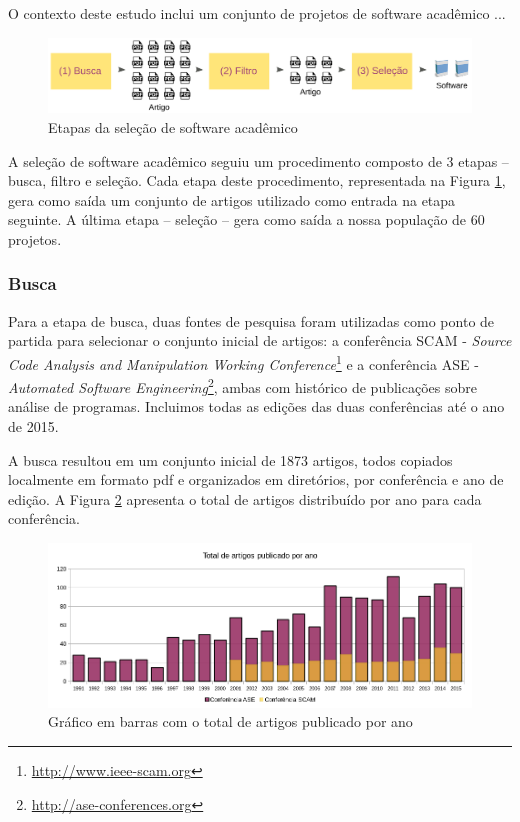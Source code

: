O contexto deste estudo inclui um conjunto de projetos de software acadêmico ...


\begin{figure}[h]
  \center
  \includegraphics[scale=0.21]{imagens/revisao-estruturada.png}
  \caption{Etapas da seleção de software acadêmico}
  \label{figura-revisao-estruturada}
\end{figure}

A seleção de software acadêmico seguiu um procedimento
composto de 3 etapas -- busca, filtro e seleção.
Cada etapa deste procedimento, representada na Figura \ref{figura-revisao-estruturada}, gera
como saída um conjunto de artigos utilizado como entrada na etapa seguinte.
A última etapa -- seleção -- gera como saída a nossa população de 60 projetos.

\subsubsection{Busca}

Para a etapa de busca, duas fontes de pesquisa foram utilizadas como ponto de partida para
selecionar o conjunto inicial de artigos: 
a conferência SCAM - {\it Source Code Analysis and
Manipulation Working Conference}\footnote{\url{http://www.ieee-scam.org}} e 
a conferência ASE - {\it Automated Software Engineering}\footnote{\url{http://ase-conferences.org}},
ambas com histórico de publicações sobre análise de programas.
Incluimos todas as edições das duas conferências até o ano de 2015.

A busca resultou em um conjunto inicial de 1873 artigos,
todos copiados localmente em formato pdf e organizados em diretórios, por conferência
e ano de edição.
A Figura \ref{artigos-por-ano} apresenta o total de artigos distribuído
por ano para cada conferência.

\begin{figure}[h]
  \center
  \includegraphics[scale=0.65]{imagens/artigos-por-ano.png}
  \caption{Gráfico em barras com o total de artigos publicado por ano}
  \label{artigos-por-ano}
\end{figure}

